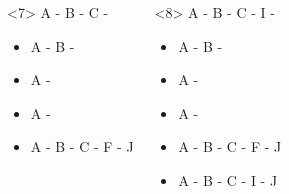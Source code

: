 \begin{frame}[fragile]
\begin{columns}[t]

\begin{onlyenv}<7>
 A - B  - C - 

\begin{itemize}
\item  A - B - 
\item  A - 
\item  A - 
\end{itemize}

\begin{itemize}
\item  A - B - C - F - J
\end{itemize}
\end{onlyenv}

\begin{onlyenv}<8>
 A - B  - C - I - 

\begin{itemize}
\item  A - B - 
\item  A - 
\item  A - 
\end{itemize}

\begin{itemize}
\item  A - B - C - F - J
\item  A - B - C - I - J
\end{itemize}

\end{onlyenv}

\end{columns}


\end{frame}


